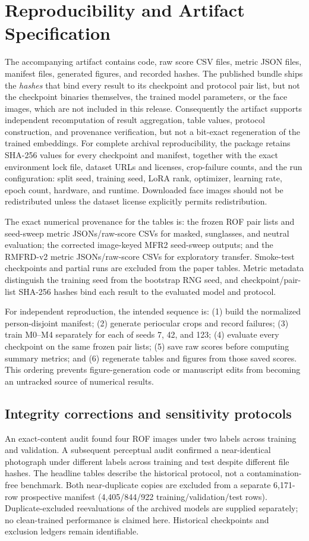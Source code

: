 \documentclass[10pt,journal,compsoc]{IEEEtran}
\begin{document}
\section{Reproducibility and Artifact Specification}
The accompanying artifact contains code, raw score CSV files, metric JSON files, manifest files, generated figures, and recorded hashes. The published bundle ships the \emph{hashes} that bind every result to its checkpoint and protocol pair list, but not the checkpoint binaries themselves, the trained model parameters, or the face images, which are not included in this release. Consequently the artifact supports independent recomputation of result aggregation, table values, protocol construction, and provenance verification, but not a bit-exact regeneration of the trained embeddings. For complete archival reproducibility, the package retains SHA-256 values for every checkpoint and manifest, together with the exact environment lock file, dataset URLs and licenses, crop-failure counts, and the run configuration: split seed, training seed, LoRA rank, optimizer, learning rate, epoch count, hardware, and runtime. Downloaded face images should not be redistributed unless the dataset license explicitly permits redistribution.

The exact numerical provenance for the tables is: the frozen ROF pair lists and seed-sweep metric JSONs/raw-score CSVs for masked, sunglasses, and neutral evaluation; the corrected image-keyed MFR2 seed-sweep outputs; and the RMFRD-v2 metric JSONs/raw-score CSVs for exploratory transfer. Smoke-test checkpoints and partial runs are excluded from the paper tables. Metric metadata distinguish the training seed from the bootstrap RNG seed, and checkpoint/pair-list SHA-256 hashes bind each result to the evaluated model and protocol.

For independent reproduction, the intended sequence is: (1) build the normalized person-disjoint manifest; (2) generate periocular crops and record failures; (3) train M0--M4 separately for each of seeds 7, 42, and 123; (4) evaluate every checkpoint on the same frozen pair lists; (5) save raw scores before computing summary metrics; and (6) regenerate tables and figures from those saved scores. This ordering prevents figure-generation code or manuscript edits from becoming an untracked source of numerical results.
\subsection{Integrity corrections and sensitivity protocols}
An exact-content audit found four ROF images under two labels across training and validation. A subsequent perceptual audit confirmed a near-identical photograph under different labels across training and test despite different file hashes. The headline tables describe the historical protocol, not a contamination-free benchmark. Both near-duplicate copies are excluded from a separate 6,171-row prospective manifest (4,405/844/922 training/validation/test rows). Duplicate-excluded reevaluations of the archived models are supplied separately; no clean-trained performance is claimed here. Historical checkpoints and exclusion ledgers remain identifiable.
\end{document}
